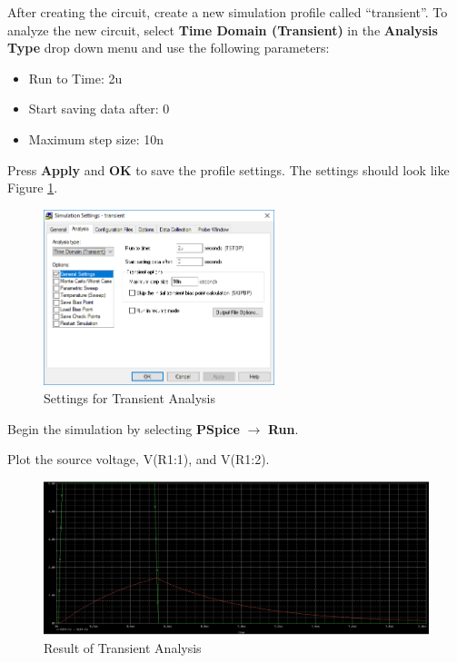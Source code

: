 \documentclass[12pt]{../manual}
\begin{document}
After creating the circuit, create a new simulation profile called ``transient''. To analyze the new circuit, select \textbf{Time Domain (Transient)} in the \textbf{Analysis Type} drop down menu and use the following parameters:
\begin{itemize}
\item Run to Time: 2u
\item Start saving data after: 0
\item Maximum step size: 10n
\end{itemize}
Press \textbf{Apply} and \textbf{OK} to save the profile settings. The settings should look like Figure \ref{fig:transSettings}.

\newpage
\begin{figure}[ht!]
	\begin{center}
		\includegraphics[width=0.6\textwidth]{figures/TransientAnalysisSettings.PNG}
	\end{center}
	\caption{Settings for Transient Analysis}
	\label{fig:transSettings}
\end{figure}

Begin the simulation by selecting \textbf{PSpice} $\to$ \textbf{Run}. 

Plot the source voltage, V(R1:1), and V(R1:2).

\begin{figure}[ht!]
	\begin{center}
		\includegraphics[width=\textwidth]{figures/ResultTransientAnalysisCrop.PNG}
	\end{center}
	\caption{Result of Transient Analysis}
	\label{fig:transAnalRes}
\end{figure}
%
\newpage
\end{document}
